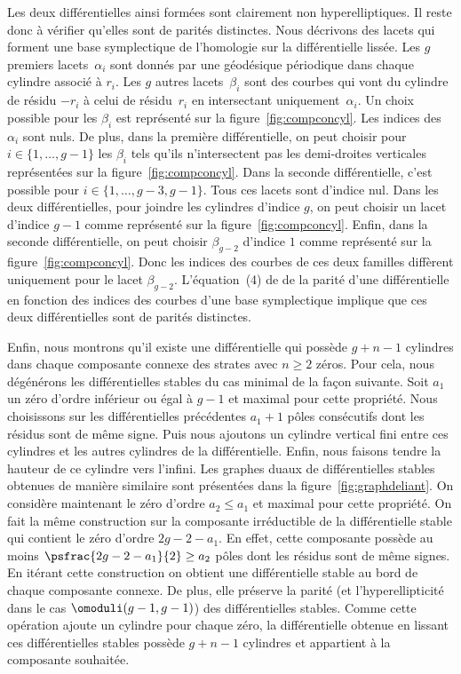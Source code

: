 Les deux différentielles ainsi formées sont clairement non hyperelliptiques. Il reste donc à vérifier qu'elles sont de parités distinctes. Nous décrivons des lacets qui forment une base symplectique de l'homologie sur la différentielle lissée. Les $g$ premiers lacets~$\alpha_{i}$ sont donnés par une géodésique périodique dans chaque cylindre associé à $r_{i}$. Les $g$ autres lacets~$\beta_{i}$ sont des courbes qui vont du cylindre de résidu $-r_{i}$ à celui de résidu~$r_{i}$ en intersectant uniquement~$\alpha_{i}$. Un choix possible pour les $\beta_{i}$ est représenté sur la figure~\ref{fig:compconcyl}. Les indices des~$\alpha_{i}$ sont nuls. De plus, dans la première différentielle, on peut choisir pour $i\in\{1,\dots,g-1\}$ les $\beta_{i}$ tels qu'ils n'intersectent pas les demi-droites verticales représentées sur la figure~\ref{fig:compconcyl}. Dans la seconde différentielle, c'est possible pour $i\in\{ 1,\dots,g-3,g-1 \}$. Tous ces lacets sont d'indice nul. Dans les deux différentielles, pour joindre les cylindres d'indice $g$, on peut choisir un lacet d'indice $g-1$ comme représenté sur la figure~\ref{fig:compconcyl}. Enfin, dans la seconde différentielle, on peut choisir $\beta_{g-2}$ d'indice $1$ comme représenté sur la figure~\ref{fig:compconcyl}. Donc les indices des courbes de ces deux familles diffèrent uniquement pour le lacet $\beta_{g-2}$. L'équation~(4) de \cite{kozo} de la parité d'une différentielle en fonction des indices des courbes d'une base symplectique implique que ces deux différentielles sont de parités distinctes.

Enfin, nous montrons qu'il existe une différentielle qui possède $g+n-1$ cylindres dans chaque composante connexe des strates avec $n\geq2$ zéros. Pour cela, nous dégénérons les différentielles stables du cas minimal de la façon suivante. Soit $a_{1}$ un zéro d'ordre inférieur ou égal à $g-1$ et maximal pour cette propriété. Nous choisissons sur les différentielles précédentes $a_{1}+1$ pôles consécutifs dont les résidus sont de même signe. Puis nous ajoutons un cylindre vertical fini entre ces cylindres et les autres cylindres de la différentielle. Enfin, nous faisons tendre la hauteur de ce cylindre vers l'infini. Les graphes duaux de différentielles stables obtenues de manière similaire sont présentées dans la figure~\ref{fig:graphdeliant}. On considère maintenant le zéro d'ordre $a_{2}\leq a_{1}$ et maximal pour cette propriété. On fait la même construction sur la composante irréductible de la différentielle stable qui contient le zéro d'ordre $2g-2-a_{1}$. En effet, cette composante possède au moins $\psfrac{2g-2-a_{1}}{2} \geq a_{2}$ pôles dont les résidus sont de même signes. En itérant cette construction on obtient une différentielle stable au bord de chaque composante connexe. De plus, elle préserve la parité (et l'hyperellipticité dans le cas $\omoduli(g-1,g-1)$) des différentielles stables. Comme cette opération ajoute un cylindre pour chaque zéro, la différentielle obtenue en lissant ces différentielles stables possède $g+n-1$ cylindres et appartient à la composante souhaitée.

\Changelback
